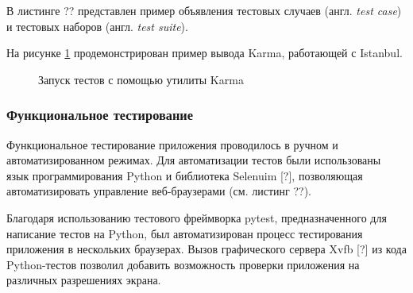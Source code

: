 В листинге ?? представлен пример объявления тестовых случаев (англ. \emph{test case}) и тестовых наборов (англ. \emph{test suite}).

{\color{gray}{*listing*}}

На рисунке \ref{fig:karma-output} продемонстрирован пример вывода Karma, работающей с Istanbul.

\begin{figure}[h!]
  \centering
  \setlength{\fboxsep}{5pt}
  \vspace*{6pt}
  \caption{Запуск тестов с помощью утилиты Karma}
  \label{fig:karma-output}
\end{figure}


\subsubsection{Функциональное тестирование}

Функциональное тестирование приложения проводилось в ручном и автоматизированном режимах. Для автоматизации тестов были использованы язык программирования Python и библиотека Selenuim [?], позволяющая автоматизировать управление веб-браузерами (см. листинг ??).

Благодаря использованию тестового фреймворка pytest, предназначенного для написание тестов на Python, был автоматизирован процесс тестирования приложения в нескольких браузерах. Вызов графического сервера Xvfb [?] из кода Python-тестов позволил добавить возможность проверки приложения на различных разрешениях экрана.

